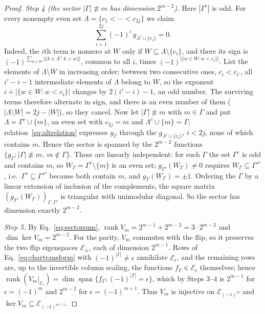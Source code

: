 \documentclass[aps,prx,reprint,superscriptaddress,nobibnotes,longbibliography]{revtex4-2}
\theoremstyle{remark}
\newcommand{\rk}{\operatorname{rank}}
\begin{document}
\begin{proof}
\emph{Step 4 (the sector $|\Gamma|\not\equiv m$ has dimension $2^{m-2}$).}  Here $|\Gamma^c|$ is odd.  For every nonempty even set $\Lambda=\{c_1<\cdots<c_{2j}\}$ we claim
\begin{equation}
 \sum_{i=1}^{2j}(-1)^i\,g_{\Lambda^c\cup\{c_i\}}=0 .
 \label{eq:altrelation}
\end{equation}
Indeed, the $i$th term is nonzero at $W$ only if $W\subseteq\Lambda\setminus\{c_i\}$, and there its sign is $(-1)^{\sum_{w\in W}|\{k\in\Lambda^c:k>w\}|}$, common to all $i$, times $(-1)^{|\{w\in W:w<c_i\}|}$.  List the elements of $\Lambda\setminus W$ in increasing order; between two consecutive ones, $c_i<c_{i'}$, all $i'-i-1$ intermediate elements of $\Lambda$ belong to $W$, so the exponent $i+|\{w\in W:w<c_i\}|$ changes by $2(i'-i)-1$, an odd number.  The surviving terms therefore alternate in sign, and there is an even number of them ($|\Lambda\setminus W|=2j-|W|$), so they cancel.  Now let $|\Gamma|\not\equiv m$ with $m\in\Gamma$ and put $\Lambda=\Gamma^c\cup\{m\}$, an even set with $c_{2j}=m$ and $\Lambda^c\cup\{m\}=\Gamma$; relation~\eqref{eq:altrelation} expresses $g_\Gamma$ through the $g_{\Lambda^c\cup\{c_i\}}$, $i<2j$, none of which contains $m$.  Hence the sector is spanned by the $2^{m-2}$ functions $\{g_\Gamma:|\Gamma|\not\equiv m,\ m\notin\Gamma\}$.  These are linearly independent: for such $\Gamma$ the set $\Gamma^c$ is odd and contains $m$, so $W_\Gamma=\Gamma^c\setminus\{m\}$ is an even set; $g_{\Gamma'}(W_\Gamma)\ne0$ requires $W_\Gamma\subseteq\Gamma'^c$, i.e.\ $\Gamma^c\subseteq\Gamma'^c$ because both contain $m$, and $g_\Gamma(W_\Gamma)=\pm1$.  Ordering the $\Gamma$ by a linear extension of inclusion of the complements, the square matrix $(g_{\Gamma'}(W_\Gamma))_{\Gamma,\Gamma'}$ is triangular with unimodular diagonal.  So the sector has dimension exactly $2^{m-2}$.

\emph{Step 5.}  By Eq.~\eqref{eq:sectorsum}, $\rk V_m=2^{m-1}+2^{m-2}=3\cdot2^{m-2}$ and $\dim\ker V_m=2^{m-2}$.  For the parity, $V_m$ commutes with the flip, so it preserves the two flip eigenspaces $\mathcal E_\pm$, each of dimension $2^{m-1}$.  Rows of Eq.~\eqref{eq:chartransform} with $(-1)^{|\Gamma|}\ne\epsilon$ annihilate $\mathcal E_\epsilon$, and the remaining rows are, up to the invertible column scaling, the functions $f_\Gamma\in\mathcal E_\epsilon$ themselves; hence $\rk(V_m|_{\mathcal E_\epsilon})=\dim\operatorname{span}\{f_\Gamma:(-1)^{|\Gamma|}=\epsilon\}$, which by Steps 3--4 is $2^{m-1}$ for $\epsilon=(-1)^m$ and $2^{m-2}$ for $\epsilon=(-1)^{m+1}$.  Thus $V_m$ is injective on $\mathcal E_{(-1)^m}$ and $\ker V_m\subseteq\mathcal E_{(-1)^{m+1}}$.
\end{proof}
\end{document}
